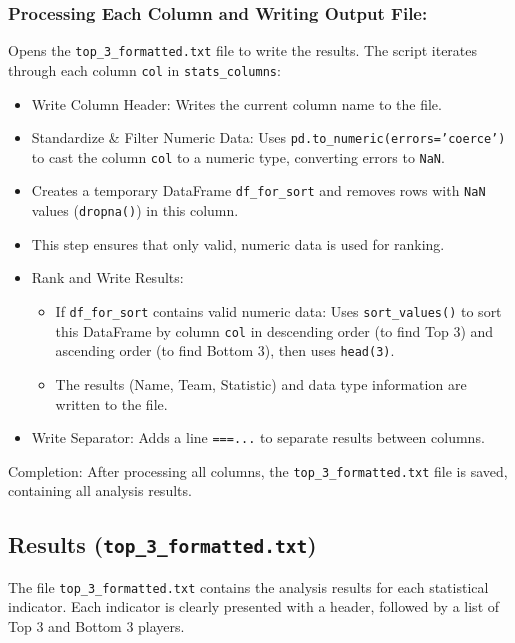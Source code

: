\documentclass[12pt, a4paper]{report}
\begin{document}
\subsubsection*{Processing Each Column and Writing Output File:}
Opens the \texttt{top\_3\_formatted.txt} file to write the results.
The script iterates through each column \texttt{col} in \texttt{stats\_columns}:
\begin{itemize}
    \item Write Column Header: Writes the current column name to the file.
    \item Standardize & Filter Numeric Data: Uses \texttt{pd.to\_numeric(errors='coerce')} to cast the column \texttt{col} to a numeric type, converting errors to \texttt{NaN}.
    \item Creates a temporary DataFrame \texttt{df\_for\_sort} and removes rows with \texttt{NaN} values (\texttt{dropna()}) in this column.
    \item This step ensures that only valid, numeric data is used for ranking.
    \item Rank and Write Results:
    \begin{itemize}
        \item If \texttt{df\_for\_sort} contains valid numeric data: Uses \texttt{sort\_values()} to sort this DataFrame by column \texttt{col} in descending order (to find Top 3) and ascending order (to find Bottom 3), then uses \texttt{head(3)}.
        \item The results (Name, Team, Statistic) and data type information are written to the file.
    \end{itemize}
    \item Write Separator: Adds a line \texttt{===...} to separate results between columns.
\end{itemize}
Completion: After processing all columns, the \texttt{top\_3\_formatted.txt} file is saved, containing all analysis results.

\subsection{Results (\texttt{top\_3\_formatted.txt})}
The file \texttt{top\_3\_formatted.txt} contains the analysis results for each statistical indicator.
Each indicator is clearly presented with a header, followed by a list of Top 3 and Bottom 3 players.
\end{document}
